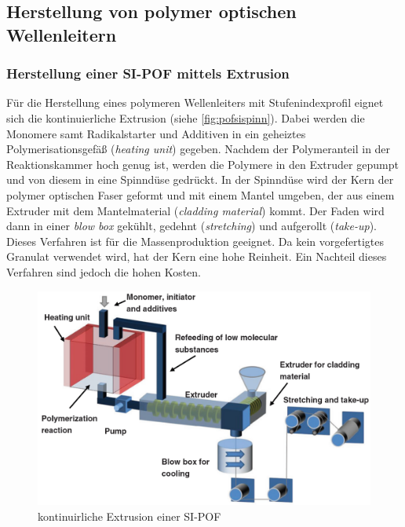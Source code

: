 \subsection{Herstellung von polymer optischen Wellenleitern}
\label{subsec:pofherstellungsverfahren}

\subsubsection{Herstellung einer SI-POF mittels Extrusion}

Für die Herstellung eines polymeren Wellenleiters mit Stufenindexprofil eignet
sich die kontinuierliche Extrusion (siehe \autoref{fig:pofsispinn}). Dabei
werden die Monomere samt Radikalstarter und Additiven in ein geheiztes
Polymerisationsgefäß (\textit{heating unit}) gegeben. Nachdem der Polymeranteil
in der Reaktionskammer hoch genug ist, werden die Polymere in den Extruder
gepumpt und von diesem in eine Spinndüse gedrückt. In der Spinndüse wird der
Kern der polymer optischen Faser geformt und mit einem Mantel umgeben, der aus
einem Extruder mit dem Mantelmaterial (\textit{cladding material}) kommt. Der
Faden wird dann in einer \textit{blow box} gekühlt, gedehnt
(\textit{stretching}) und aufgerollt (\textit{take-up}). Dieses Verfahren ist
für die Massenproduktion geeignet. Da kein vorgefertigtes Granulat verwendet
wird, hat der Kern eine hohe Reinheit. Ein Nachteil dieses Verfahren sind jedoch
die hohen Kosten.

\begin{figure}[h]
    \begin{center}
        \begin{minipage}[t]{\textwidth}
            \begin{center}
                \includegraphics[height=0.25\textheight]{Bilder/Optische_Wellenleiter_Die_Polymer_Optische_Faser/Herstellung/pofsispinn.png}
                \caption[kontinuirliche Extrusion einer SI-POF \newline \url{http://www.researchgate.net/publication/265646639_An_overview_on_fabrication_methods_for_polymer_optical_fibers} S. 5 (zuletzt aufgerufen am 28.09.2015)]{kontinuirliche Extrusion einer SI-POF}
                \label{fig:pofsispinn}
            \end{center}
        \end{minipage}
    \end{center}
\end{figure}


